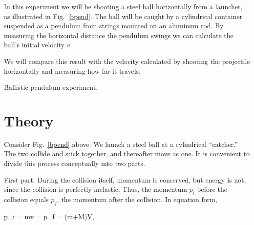In this experiment we will be shooting a steel ball horizontally from
a launcher, as illustrated in Fig.~\ref{bpend}.  The ball will be
caught by a cylindrical container suspended as a pendulum from strings
mounted on an aluminum rod.  By measuring the horizontal distance the
pendulum swings we can calculate the ball's initial velocity $v$.

We will compare this result with the velocity calculated by shooting
the projectile horizontally and measuring how far it travels.


\bfig
\begin{center}
{}
\end{center}
\caption{Ballistic pendulum experiment. \label{bpend}}
\efig

\section*{Theory}

Consider Fig.~\ref{bpend} above:  We launch a
steel ball 
at a cylindrical ``catcher.''  The two collide and stick together, and
thereafter move as one.  It is convenient to divide this process
conceptually into two parts.

First part: During the collision itself, momentum is conserved, but
energy is not, since the collision is perfectly inelastic.  Thus, the momentum
$p_{i}$ before the collision equals $p_{f}$, the momentum after the
collision.  In equation form,

\beq
p_{i} = mv = p_{f} = (m+M)V, \label{pi=pf}
\eeq

